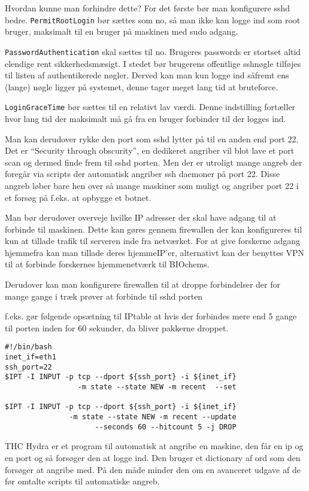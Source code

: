 \documentclass[10pt,a4paper,danish]{article}
\begin{document}
Hvordan kunne man forhindre dette?
For det første bør man konfigurere sshd bedre.
\texttt{PermitRootLogin} bør sættes som no, så man ikke kan logge ind som root
bruger, maksimalt til en bruger på maskinen med sudo adgang.

\texttt{PasswordAuthentication} skal sættes til no.
Brugeres passwords er stortset altid elendige rent sikkerhedsmæsigt. I stedet
bør brugerens offentlige sshnøgle tilføjes til listen af authentikerede nøgler.
Derved kan man kun logge ind såfremt ens (lange) nøgle ligger på systemet, denne
tager meget lang tid at bruteforce.

\texttt{LoginGraceTime} bør sættes til en relativt lav værdi. Denne indstilling
fortæller hvor lang tid der maksimalt må gå fra en bruger forbinder til der
logges ind.

Man kan derudover rykke den port som sshd lytter på til en anden end port 22.
Det er ``Security through obscurity'', en dedikeret angriber vil blot lave et
port scan og dermed finde frem til sshd porten. Men der er utroligt mange angreb
der foregår via scripts der automatisk angriber ssh daemoner på port 22.
Disse angreb løber bare hen over så mange maskiner som muligt og angriber port
22 i et forsøg på f.eks. at opbygge et botnet.

Man bør derudover overveje hvilke IP adresser der skal have adgang til at
forbinde til maskinen. Dette kan gøres gennem firewallen der kan konfigureres
til kun at tillade trafik til serveren inde fra netværket.
For at give forskerne adgang hjemmefra kan man tillade deres hjemmeIP'er,
alternativt kan der benyttes VPN til at forbinde forskernes hjemmenetværk til
BIOchems.

Derudover kan man konfigurere firewallen til at droppe forbindelser der for
mange gange i træk prøver at forbinde til sshd porten

f.eks. gør følgende opsætning\cite{portdrop} til IPtable at hvis der forbindes mere end 5 gange
til porten inden for 60 sekunder, da bliver pakkerne droppet.
\begin{verbatim}
#!/bin/bash
inet_if=eth1
ssh_port=22
$IPT -I INPUT -p tcp --dport ${ssh_port} -i ${inet_if}
                 -m state --state NEW -m recent  --set

$IPT -I INPUT -p tcp --dport ${ssh_port} -i ${inet_if}
               -m state --state NEW -m recent --update
                     --seconds 60 --hitcount 5 -j DROP
\end{verbatim}


THC Hydra er et program til automatisk at angribe en maskine, den får en ip og en
port og så forsøger den at logge ind. Den bruger et dictionary af ord som den
forsøger at angribe med.
På den måde minder den om en avanceret udgave af de før omtalte scripts til
automatiske angreb.
\end{document}
